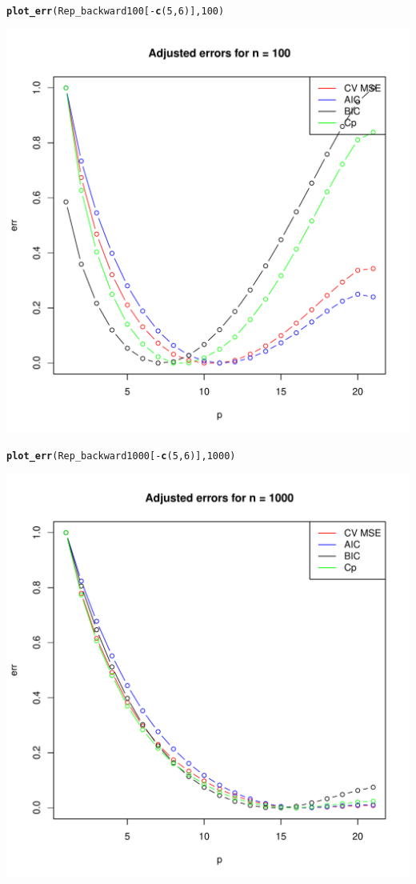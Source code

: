 \documentclass[11pt]{article}\usepackage[]{graphicx}\usepackage[]{color}
\makeatletter
\def\maxwidth{ %
  \ifdim\Gin@nat@width>\linewidth
    \linewidth
  \else
    \Gin@nat@width
  \fi
}
\newcommand{\hlnum}[1]{\textcolor[rgb]{0.686,0.059,0.569}{#1}}%
\newcommand{\hlopt}[1]{\textcolor[rgb]{0,0,0}{#1}}%
\newcommand{\hlstd}[1]{\textcolor[rgb]{0.345,0.345,0.345}{#1}}%
\newcommand{\hlkwd}[1]{\textcolor[rgb]{0.737,0.353,0.396}{\textbf{#1}}}%
\newenvironment{kframe}{%
 \def\at@end@of@kframe{}%
 \ifinner\ifhmode%
  \def\at@end@of@kframe{\end{minipage}}%
  \begin{minipage}{\columnwidth}%
 \fi\fi%
 \def\FrameCommand##1{\hskip\@totalleftmargin \hskip-\fboxsep
 \colorbox{shadecolor}{##1}\hskip-\fboxsep
     \hskip-\linewidth \hskip-\@totalleftmargin \hskip\columnwidth}%
 \MakeFramed {\advance\hsize-\width
   \@totalleftmargin\z@ \linewidth\hsize
   \@setminipage}}%
 {\par\unskip\endMakeFramed%
 \at@end@of@kframe}
\newenvironment{knitrout}{}{} %
\makeatother
\begin{document}
\begin{knitrout}
\begin{kframe}
\begin{alltt}
\hlkwd{plot_err}\hlstd{(Rep_backward100[}\hlopt{-}\hlkwd{c}\hlstd{(}\hlnum{5}\hlstd{,}\hlnum{6}\hlstd{)],}\hlnum{100}\hlstd{)}
\end{alltt}
\end{kframe}
\includegraphics[width=\maxwidth]{figure/unnamed-chunk-5-1} 
\begin{kframe}\begin{alltt}
\hlkwd{plot_err}\hlstd{(Rep_backward1000[}\hlopt{-}\hlkwd{c}\hlstd{(}\hlnum{5}\hlstd{,}\hlnum{6}\hlstd{)],}\hlnum{1000}\hlstd{)}
\end{alltt}
\end{kframe}
\includegraphics[width=\maxwidth]{figure/unnamed-chunk-5-2} 

\end{knitrout}
\end{document}
